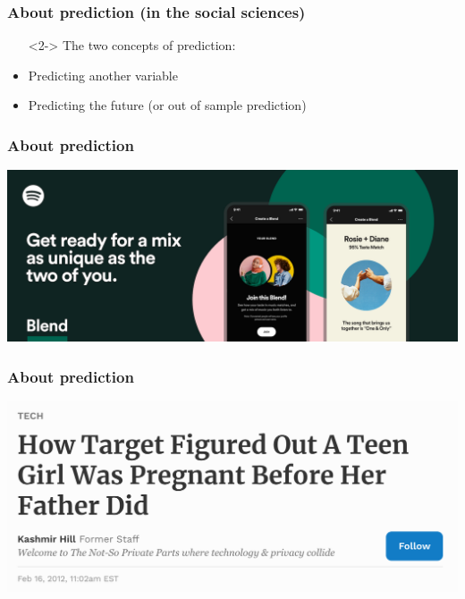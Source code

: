 \documentclass[aspectratio=43]{beamer}
\begin{document}
\begin{frame}
\frametitle{About prediction (in the social sciences)}
\centering

\begin{itemize}
  \item[]<2-> The two concepts of prediction:
  \item<2-> Predicting another variable
  \item<2-> Predicting the future (or out of sample prediction)
\end{itemize}

\end{frame}

\begin{frame}
\frametitle{About prediction}
\centering

\includegraphics[width = \textwidth]{../img/spotify}

\end{frame}

\begin{frame}
\frametitle{About prediction}
\centering

\includegraphics[width = \textwidth]{../img/target_pregnancy}

\end{frame}
\end{document}
